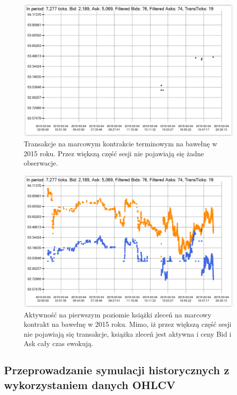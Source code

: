 \documentclass[a4paper,12pt,openany, DIV=calc, headsepline]{scrbook}
\begin{document}
\begin{figure}[H]
  \centering
  \includegraphics[scale=0.5]{wykresy/cottonTickH.PNG}
  \caption{Transakcje na marcowym kontrakcie terminowym na bawełnę w 2015 roku. Przez większą część sesji nie pojawiają się żadne obserwacje.}
  \label{fig:cottonTrans}
\end{figure}

\begin{figure}[H]
  \centering
  \includegraphics[scale=0.5]{wykresy/cottonOrderH.PNG}
  \caption{Aktywność na pierwszym poziomie książki zleceń na marcowy kontrakt na bawełnę w 2015 roku. Mimo, iż przez większą część sesji nie pojawiają się transakcje, książka zleceń jest aktywna i ceny Bid i Ask cały czas ewokują.}
  \label{fig:cottonOrder}
\end{figure}

\subsection{Przeprowadzanie symulacji historycznych z wykorzystaniem danych OHLCV}
\end{document}
